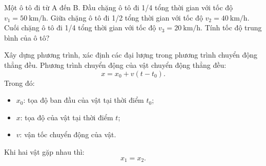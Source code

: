 \begin{vd}
	Một ô tô đi từ A đến B. Đầu chặng ô tô đi 1/4 tổng thời gian với tốc độ $v_1=\SI{50}{\kilo\meter/\hour}$. Giữa chặng ô tô đi 1/2 tổng thời gian với tốc độ $v_2=\SI{40}{\kilo\meter/\hour}$. Cuối chặng ô tô đi 1/4 tổng thời gian với tốc độ $v_3=\SI{20}{\kilo\meter/\hour}$. Tính tốc độ trung bình của ô tô?
\end{vd}
\begin{dang}{Xây dựng phương trình, xác định các đại lượng trong phương trình chuyển động thẳng đều.}
		Phương trình chuyển động của vật chuyển động thẳng đều:
	$$x=x_0+v\left(t-t_0\right).$$
	Trong đó:
	\begin{itemize}
		\item $x_0$: tọa độ ban đầu của vật tại thời điểm $t_0$;
		\item $x$: tọa độ của vật tại thời điểm $t$;
		\item $v$: vận tốc chuyển động của vật.
	\end{itemize}
	Khi hai vật gặp nhau thì:
	$$x_1=x_2.$$
\end{dang}
